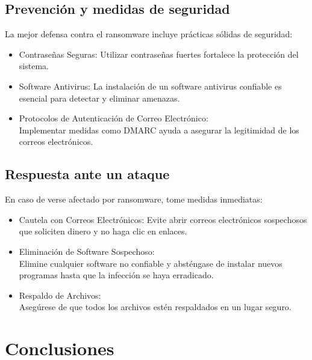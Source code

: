 \documentclass[letterpaper, 12pt]{article}
\begin{document}
\subsection{Prevención y medidas de seguridad}

La mejor defensa contra el ransomware incluye prácticas
sólidas de seguridad:

\begin{itemize}[label=$\diamond$]
    \item Contraseñas Seguras: Utilizar contraseñas fuertes fortalece
          la protección del sistema.

    \item Software Antivirus: La instalación de un software antivirus
          confiable es esencial para detectar y eliminar amenazas.

    \item Protocolos de Autenticación de Correo Electrónico: \\
          Implementar medidas como DMARC ayuda a asegurar la
          legitimidad de los correos electrónicos.
\end{itemize}

\subsection{Respuesta ante un ataque}

En caso de verse afectado por ransomware, tome medidas
inmediatas:

\begin{itemize}[label=$\diamond$]
    \item Cautela con Correos Electrónicos: Evite abrir correos
          electrónicos sospechosos que soliciten dinero y no haga
          clic en enlaces.

    \item Eliminación de Software Sospechoso: \\ Elimine cualquier
          software no confiable y absténgase de instalar nuevos
          programas hasta que la infección se haya erradicado.

    \item Respaldo de Archivos: \\ Asegúrese de que todos los
          archivos estén respaldados en un lugar seguro.
\end{itemize}

\section{Conclusiones}
\end{document}
